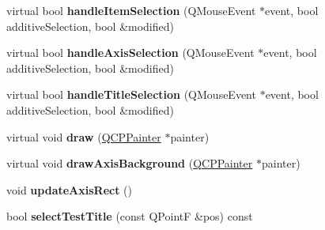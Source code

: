 \begin{DoxyCompactItemize}
\item 
\hypertarget{classQCustomPlot_aa1ad9839539b4cdf9f7da768336650f2}{virtual bool {\bfseries handle\-Item\-Selection} (Q\-Mouse\-Event $\ast$event, bool additive\-Selection, bool \&modified)}\label{classQCustomPlot_aa1ad9839539b4cdf9f7da768336650f2}

\item 
\hypertarget{classQCustomPlot_a6500e0aa6de356954b81f091e819c637}{virtual bool {\bfseries handle\-Axis\-Selection} (Q\-Mouse\-Event $\ast$event, bool additive\-Selection, bool \&modified)}\label{classQCustomPlot_a6500e0aa6de356954b81f091e819c637}

\item 
\hypertarget{classQCustomPlot_ae688ab743e775cd0c69941a082dd32e3}{virtual bool {\bfseries handle\-Title\-Selection} (Q\-Mouse\-Event $\ast$event, bool additive\-Selection, bool \&modified)}\label{classQCustomPlot_ae688ab743e775cd0c69941a082dd32e3}

\item 
\hypertarget{classQCustomPlot_ad7a7d878bf050f101a43008e7d8fdb52}{virtual void {\bfseries draw} (\hyperlink{classQCPPainter}{Q\-C\-P\-Painter} $\ast$painter)}\label{classQCustomPlot_ad7a7d878bf050f101a43008e7d8fdb52}

\item 
\hypertarget{classQCustomPlot_a2ddc6669cdcd1224803f78e579858b16}{virtual void {\bfseries draw\-Axis\-Background} (\hyperlink{classQCPPainter}{Q\-C\-P\-Painter} $\ast$painter)}\label{classQCustomPlot_a2ddc6669cdcd1224803f78e579858b16}

\item 
\hypertarget{classQCustomPlot_a428242419d3a1b63f2cbff637986c35c}{void {\bfseries update\-Axis\-Rect} ()}\label{classQCustomPlot_a428242419d3a1b63f2cbff637986c35c}

\item 
\hypertarget{classQCustomPlot_a2a2d01a092840ac01b16104f7973f831}{bool {\bfseries select\-Test\-Title} (const Q\-Point\-F \&pos) const }\label{classQCustomPlot_a2a2d01a092840ac01b16104f7973f831}

\end{DoxyCompactItemize}
